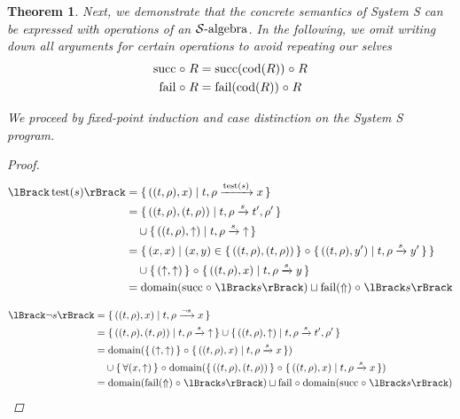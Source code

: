 \documentclass{article}
\newtheorem{theorem}{Theorem}
\newcommand{\fail}{\ensuremath \text{$\uparrow$}}
\newcommand{\test}[1]{\ensuremath \operatorname{test}(#1)}
\newcommand{\transform}[5]{#1, #2 \xrightarrow{#3} #4, #5}
\newcommand{\transformx}[4]{#1, #2 \xrightarrow{#3} #4}
\newcommand{\transformfail}[3]{#1, #2 \xrightarrow{#3} \fail}
\newcommand{\cod}{\ensuremath \operatorname{cod}}
\newcommand{\Fail}{\ensuremath \text{$\Uparrow$}}
\newcommand{\sem}[1]{\ensuremath \lBrack #1 \rBrack}
\newcommand{\setbuild}[2]{\ensuremath \{\, #1 \mid #2 \,\}}
\newcommand{\setbuildc}[1]{\ensuremath \{\, #1 \,\}}
\newcommand{\SAlgebra}{\ensuremath \mathcal{S}\text{-algebra}}
\newcommand{\domain}{\ensuremath \operatorname{domain}}
\newcommand{\lfail}{\ensuremath \operatorname{fail}}
\newcommand{\lsucc}{\ensuremath \operatorname{succ}}
\newcommand{\comp}{\ensuremath \mathrel{\circ}}
\begin{document}
\begin{theorem} \normalfont
  Next, we demonstrate that the concrete semantics of System S can be expressed with operations of an $\SAlgebra$. In the following, we omit writing down all arguments for certain operations to avoid repeating our selves
  \begin{align*}
    \lsucc \comp R &= \lsucc(\cod(R)) \comp R \\
    \lfail \comp R &= \lfail(\cod(R)) \comp R \\
  \end{align*}

 We proceed by fixed-point induction and case distinction on the System S program.
\begin{proof}


\begin{align*}
  \sem{\test{s}}
    &= \setbuild{((t,\rho),x)}{\transformx{t}{\rho}{\test{s}}{x}} \\
     &= \setbuild{((t,\rho),(t,\rho))}{\transform{t}{\rho}{s}{t'}{\rho'}} \\
     &\quad \cup \setbuild{((t,\rho),\fail)}{\transformfail{t}{\rho}{s}} \\
     &= \setbuild{ (x,x) }{ (x,y) \in \setbuildc{((t,\rho),(t,\rho))} \comp \setbuild{((t,\rho),y')}{\transformx{t}{\rho}{s}{y'}}} \\
     &\quad \cup \setbuildc{(\fail,\fail)} \comp \setbuild{((t,\rho),x)}{\transformx{t}{\rho}{s}{y}} \\
     &= \domain(\lsucc \comp \sem{s}) \sqcup \lfail(\Fail) \comp \sem{s}
\end{align*}

\begin{align*}
  \sem{\neg{s}}
    &= \setbuild{((t,\rho),x)}{\transformx{t}{\rho}{\neg{s}}{x}} \\
    &= \setbuild{((t,\rho),(t,\rho))}{\transformfail{t}{\rho}{s}} \cup \setbuild{((t,\rho),\fail)}{\transform{t}{\rho}{s}{t'}{\rho'}} \\
    &= \domain(\setbuildc{(\fail,\fail)} \comp \setbuild{((t,\rho),x)}{\transformx{t}{\rho}{s}{x}}) \\
    &\quad \cup \setbuildc{\forall (x,\fail)} \comp \domain(\setbuildc{((t,\rho),(t,\rho))} \comp \setbuild{((t,\rho),x)}{\transformx{t}{\rho}{s}{x}}) \\
    &= \domain(\lfail(\Fail) \comp \sem{s}) \sqcup \lfail \comp \domain(\lsucc \comp \sem{s})
\end{align*}


\end{proof}
\end{theorem}
\end{document}
